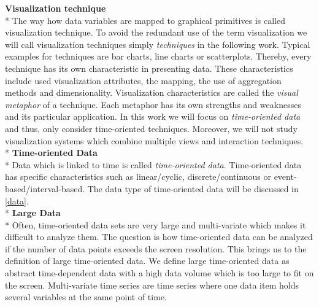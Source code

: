 \iffalse
Data Mining tools allow automatic decision-making by algorithms which are applied to the data and extract patterns in an automatic way\cite{Goebel1999}. Exploratory data analysis (EDA) tools are used to mine data with support of human input. We will use the definition of EDA tools if we speak of visualization tools in this work. As a pwc-survey showed eventhough automatic ways for decision support exist data analysis still relies on human judgement and thus\cite{PwC2016}, visualization tools are used to support the business user in the data discovery process. The main goal of visualization tools is the user support in gaining insights into the data. 
Visualization tools display hundreds of items on the screen and offer interaction techniques such as zooming and filtering\cite{Shneiderman2008}.
\fi
\textbf{Visualization technique}\\*
The way how data variables are mapped to graphical primitives is called visualization technique. To avoid the redundant use of the term visualization we will call visualization techniques simply \textit{techniques} in the following work. Typical examples for techniques are bar charts, line charts or scatterplots. Thereby, every technique has its own characteristic in presenting data. These characteristics include used visualization attributes, the mapping, the use of aggregation methods and dimensionality. Visualization characteristics are called the \textit{visual metaphor} of a technique\cite{Tegarden1999}. Each metaphor has its own strengths and weaknesses and its particular application. In this work we will focus on \textit{time-oriented data} and thus, only consider time-oriented techniques. Moreover, we will not study visualization systems which combine multiple views and interaction techniques.\\*
\textbf{Time-oriented Data}\\*
Data which is linked to time\cite{Aigner2011} is called \textit{time-oriented data}. Time-oriented data has specific characteristics such as linear/cyclic, discrete/continuous or event-based/interval-based. The data type of time-oriented data will be discussed in \ref{data}.\\*
\textbf{Large Data}\\*
Often, time-oriented data sets are very large and multi-variate which makes it difficult to analyze them. The question is how time-oriented data can be analyzed if the number of data points exceeds the screen resolution. This brings us to the definition of large time-oriented data. 
We define large time-oriented data as abstract time-dependent data with a high data volume  which is too large to fit on the screen\cite{Shneiderman2008}. Multi-variate time series are time series where one data item holds several variables at the same point of time\cite{Aigner2011}.
